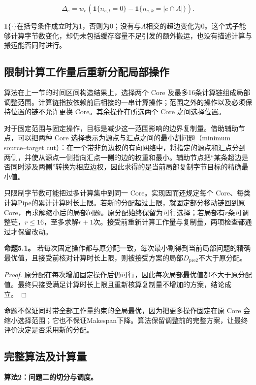 \documentclass[anonymous,notoc]{gmcm2026}
\begin{document}
\[\Delta_e=w_e\left(\mathbf1\{n_{e,l}=0\}-\mathbf1\{n_{e,k}=|e\cap A|\}\right).\]

\(\mathbf1\{\cdot\}\)在括号条件成立时为1，否则为0；没有与\(A\)相交的超边变化为0。这个式子能够计算字节数变化，却仍未包括缓存容量不足引发的额外搬运，也没有描述计算与搬运能否同时进行。

\subsection{限制计算工作量后重新分配局部操作}

算法在上一节的时间区间构造结果上，选择两个 Core 及最多16条计算链组成局部调整范围。计算链指按依赖前后相接的一串计算操作；范围之外的操作以及必须保持位置的链不允许更换 Core。其余操作在所选两个 Core 之间选择位置。

对于固定范围与固定操作，目标是减少这一范围影响的边界复制量。借助辅助节点，可以把两种 Core 选择表示为源点与汇点之间的最小割问题（minimum source--target cut）：在一个带非负边权的有向网络中，将指定的源点和汇点分到两侧，并使从源点一侧指向汇点一侧的边的权重和最小。辅助节点把``某条超边是否同时涉及两侧''转换为相应边权，因此求得的是当前局部复制字节目标的精确最小值。

只限制字节数可能把过多计算集中到同一 Core。实现因而还规定每个 Core、每类计算Pipe的累计计算时长上限。若新的分配超过上限，就固定部分移动链回到原 Core，再求解缩小后的局部问题。原分配始终保留为可行选择；若局部有\(r\)条可调整链，\(r\le16\)，至多求解\(r+1\)次。接受前重新计算工作量与复制量，两项检查都通过才保留改动。

\textbf{命题5.1。} 若每次固定操作都与原分配一致，每次最小割得到当前局部问题的精确最优值，且接受前核对计算时长上限，则被接受方案的局部\(D_{\mathrm{pre2}}\)不大于原分配。

\begin{proof} 原分配在每次增加固定操作后仍可行，因此每次局部最优值都不大于原分配值。最终只接受满足计算时长上限且重新核算复制量不增加的方案，结论成立。\end{proof}

命题不保证同时带全部工作量约束的全局最优，因为把更多操作固定在原 Core 会缩小选择范围；它也不保证Makespan下降。算法保留调整前的完整方案，让最终评价决定是否采用新的分配。

\subsection{完整算法及计算量}

\textbf{算法2：问题二的切分与调度。}
\end{document}
